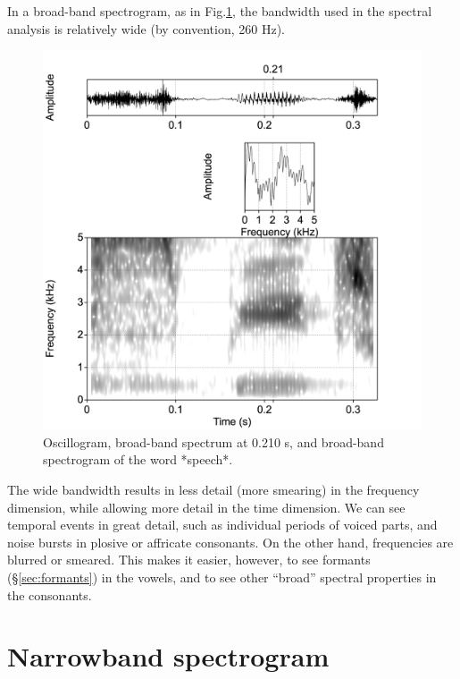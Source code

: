 \documentclass[
]{book}
\begin{document}
In a broad-band spectrogram, as in Fig.\ref{fig:speech-word-spectrogram-broad}, the bandwidth used in the spectral analysis is relatively wide (by convention, 260 Hz).

\begin{figure}

{\centering \includegraphics{figures/speech_word_spectrogram_5ms} 

}

\caption{Oscillogram, broad-band spectrum at 0.210 s, and broad-band spectrogram of the word *speech*.}\label{fig:speech-word-spectrogram-broad}
\end{figure}

The wide bandwidth results in less detail (more smearing) in the frequency dimension, while allowing more detail in the time dimension. We can see temporal events in great detail, such as individual periods of voiced parts, and noise bursts in plosive or affricate consonants. On the other hand, frequencies are blurred or smeared. This makes it easier, however, to see formants (§\ref{sec:formants}) in the vowels, and to see other ``broad'' spectral properties in the consonants.

\section{Narrowband spectrogram}\label{narrowband-spectrogram}
\end{document}
